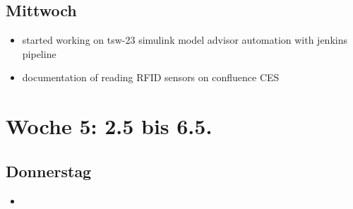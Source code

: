 \subsection{Mittwoch}
\begin{itemize}
	\item started working on tsw-23 simulink model advisor automation with jenkins pipeline
	\item documentation of reading RFID sensors on confluence \ac{CES}
\end{itemize}

\section{Woche 5: 2.5 bis 6.5.}
\subsection{Donnerstag}
\begin{itemize}
	\item 
\end{itemize}